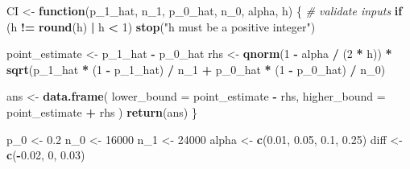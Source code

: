 \documentclass[
]{article}
\newenvironment{Shaded}{\begin{snugshade}}{\end{snugshade}}
\newcommand{\CommentTok}[1]{\textcolor[rgb]{0.56,0.35,0.01}{\textit{#1}}}
\newcommand{\ControlFlowTok}[1]{\textcolor[rgb]{0.13,0.29,0.53}{\textbf{#1}}}
\newcommand{\DataTypeTok}[1]{\textcolor[rgb]{0.13,0.29,0.53}{#1}}
\newcommand{\DecValTok}[1]{\textcolor[rgb]{0.00,0.00,0.81}{#1}}
\newcommand{\FloatTok}[1]{\textcolor[rgb]{0.00,0.00,0.81}{#1}}
\newcommand{\KeywordTok}[1]{\textcolor[rgb]{0.13,0.29,0.53}{\textbf{#1}}}
\newcommand{\NormalTok}[1]{#1}
\newcommand{\OperatorTok}[1]{\textcolor[rgb]{0.81,0.36,0.00}{\textbf{#1}}}
\newcommand{\StringTok}[1]{\textcolor[rgb]{0.31,0.60,0.02}{#1}}
\begin{document}
\begin{Shaded}
\begin{Highlighting}[]
\NormalTok{CI <-}\StringTok{ }\ControlFlowTok{function}\NormalTok{(p_}\DecValTok{1}\NormalTok{_hat, n_}\DecValTok{1}\NormalTok{, p_}\DecValTok{0}\NormalTok{_hat, n_}\DecValTok{0}\NormalTok{, alpha, h) \{}
  \CommentTok{# validate inputs}
  \ControlFlowTok{if}\NormalTok{ (h }\OperatorTok{!=}\StringTok{ }\KeywordTok{round}\NormalTok{(h) }\OperatorTok{|}\StringTok{ }\NormalTok{h }\OperatorTok{<}\StringTok{ }\DecValTok{1}\NormalTok{) }\KeywordTok{stop}\NormalTok{(}\StringTok{"h must be a positive integer"}\NormalTok{)}

\NormalTok{  point_estimate <-}\StringTok{ }\NormalTok{p_}\DecValTok{1}\NormalTok{_hat }\OperatorTok{-}\StringTok{ }\NormalTok{p_}\DecValTok{0}\NormalTok{_hat}
\NormalTok{  rhs <-}\StringTok{ }\KeywordTok{qnorm}\NormalTok{(}\DecValTok{1} \OperatorTok{-}\StringTok{ }\NormalTok{alpha }\OperatorTok{/}\StringTok{ }\NormalTok{(}\DecValTok{2} \OperatorTok{*}\StringTok{ }\NormalTok{h)) }\OperatorTok{*}\StringTok{ }\KeywordTok{sqrt}\NormalTok{(p_}\DecValTok{1}\NormalTok{_hat }\OperatorTok{*}\StringTok{ }\NormalTok{(}\DecValTok{1} \OperatorTok{-}\StringTok{ }\NormalTok{p_}\DecValTok{1}\NormalTok{_hat) }\OperatorTok{/}\StringTok{ }\NormalTok{n_}\DecValTok{1} \OperatorTok{+}\StringTok{ }\NormalTok{p_}\DecValTok{0}\NormalTok{_hat }\OperatorTok{*}\StringTok{ }\NormalTok{(}\DecValTok{1} \OperatorTok{-}\StringTok{ }\NormalTok{p_}\DecValTok{0}\NormalTok{_hat) }\OperatorTok{/}\StringTok{ }\NormalTok{n_}\DecValTok{0}\NormalTok{)}

\NormalTok{  ans <-}\StringTok{ }\KeywordTok{data.frame}\NormalTok{(}
    \DataTypeTok{lower_bound =}\NormalTok{ point_estimate }\OperatorTok{-}\StringTok{ }\NormalTok{rhs,}
    \DataTypeTok{higher_bound =}\NormalTok{ point_estimate }\OperatorTok{+}\StringTok{ }\NormalTok{rhs}
\NormalTok{  )}
  \KeywordTok{return}\NormalTok{(ans)}
\NormalTok{\}}

\NormalTok{p_}\DecValTok{0}\NormalTok{ <-}\StringTok{ }\FloatTok{0.2}
\NormalTok{n_}\DecValTok{0}\NormalTok{ <-}\StringTok{ }\DecValTok{16000}
\NormalTok{n_}\DecValTok{1}\NormalTok{ <-}\StringTok{ }\DecValTok{24000}
\NormalTok{alpha <-}\StringTok{ }\KeywordTok{c}\NormalTok{(}\FloatTok{0.01}\NormalTok{, }\FloatTok{0.05}\NormalTok{, }\FloatTok{0.1}\NormalTok{, }\FloatTok{0.25}\NormalTok{)}
\NormalTok{diff <-}\StringTok{ }\KeywordTok{c}\NormalTok{(}\OperatorTok{-}\FloatTok{0.02}\NormalTok{, }\DecValTok{0}\NormalTok{, }\FloatTok{0.03}\NormalTok{)}


\end{Highlighting}
\end{Shaded}
\end{document}
